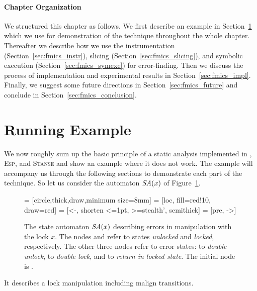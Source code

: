 \paragraph{Chapter Organization}
We structured this chapter as follows. We first describe an example in
Section~\ref{sec:fmics_example} which we use for demonstration of the
technique throughout the whole chapter. Thereafter we describe how we use
the instrumentation (Section~\ref{sec:fmics_instr}), slicing
(Section~\ref{sec:fmics_slicing}), and symbolic execution
(Section~\ref{sec:fmics_symexe}) for error-finding. Then we discuss the
process of implementation and experimental results in
Section~\ref{sec:fmics_impl}. Finally, we suggest some future directions in
Section~\ref{sec:fmics_future} and conclude in
Section~\ref{sec:fmics_conclusion}.

\section{Running Example}\label{sec:fmics_example}
We now roughly sum up the basic principle of a static analysis implemented
in \xgcc, \textsc{Esp}, and \textsc{Stanse} and show an example where it does
not work. The example will accompany us through the following sections to
demonstrate each part of the technique. So let us consider the automaton
${\textit{SA}}(x)$ of Figure~\ref{fig:sm}.  \begin{figure}[htb] \begin{center}
 = [circle,thick,draw,minimum size=8mm]  = [loc,
fill=red!10, draw=red]  = [<-, shorten <=1pt, >=stealth',
semithick]  = [pre, ->]  \end{center} \caption{The state
automaton ${\textit{SA}}(x)$ describing errors in manipulation with the lock $x$. The
nodes  and  refer to states \emph{unlocked} and \emph{locked},
respectively. The other three nodes refer to error states:  to
\emph{double unlock},  to \emph{double lock}, and  to
\emph{return in locked state}. The initial node is .} \label{fig:sm}
\end{figure} It describes a lock manipulation including malign transitions.
